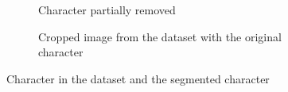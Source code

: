 \begin{figure}[ht]
  \centering
  \begin{subfigure}{0.49\textwidth}
    \centering
    \caption{Character partially removed}
    \label{fig:results:3l:s}
  \end{subfigure}
  \begin{subfigure}{0.49\textwidth}
    \centering
    \caption{Cropped image from the dataset with the original character}
    \label{fig:results:3l:o}
  \end{subfigure}
  \caption{Character in the dataset and the segmented character}
  \label{fig:results:3l}
\end{figure}


